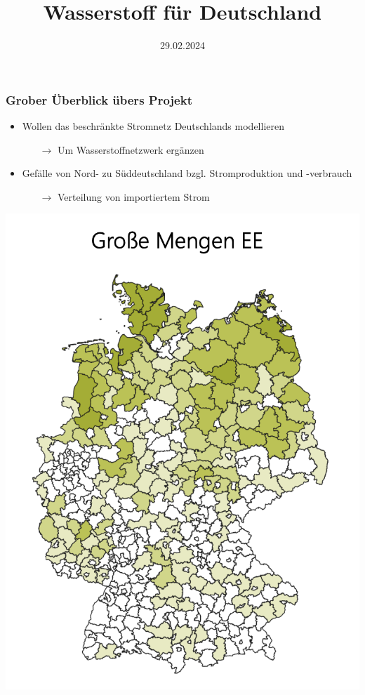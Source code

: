 \documentclass[aspectratio=169,t]{beamer}
\title{Wasserstoff für Deutschland}
\subtitle{}
\date{29.02.2024}
\author{}
\begin{document}
	
	\maketitle
	
	
	

	
	\begin{frame}
		\frametitle{Grober Überblick übers Projekt}
		\vspace*{-4mm}
		\begin{minipage}{1\linewidth}
			\begin{minipage}{.5\linewidth}
				
				\vspace*{-12mm}
				
		\begin{itemize}
			\item Wollen das beschränkte Stromnetz Deutschlands modellieren
			\vspace*{2mm}
			
			\begin{itemize}
				\item [$\rightarrow$] Um Wasserstoffnetzwerk ergänzen
			\end{itemize}
		\vspace*{2mm}
		
		\item Gefälle von Nord- zu Süddeutschland bzgl. Stromproduktion und -verbrauch
		\vspace*{2mm}
		
		\begin{itemize}
			\item [$\rightarrow$] Verteilung von importiertem Strom
		\end{itemize}
				 
		\end{itemize}
	\end{minipage}
\hfill
\begin{minipage}{.5\linewidth}
\centering
\includegraphics[width=.7\linewidth]{renewable.png}


\end{minipage}
\end{minipage}
\end{frame}
\end{document}

